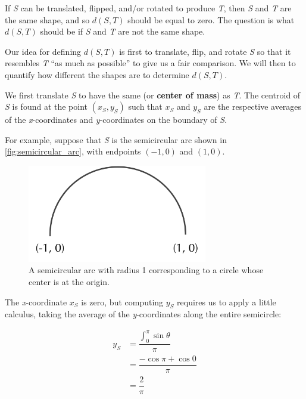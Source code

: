 If \textit{S} can be translated, flipped, and/or rotated to produce \textit{T}, then \textit{S} and \textit{T} are the same shape, and so $d(S, T)$ should be equal to zero. The question is what $d(S, T)$ should be if \textit{S} and \textit{T} are not the same shape.

Our idea for defining $d(S, T)$ is first to translate, flip, and rotate \textit{S} so that it resembles \textit{T} ``as much as possible'' to give us a fair comparison. We will then to quantify how different the shapes are to determine $d(S, T)$.

We first translate \textit{S} to have the same  (or \textbf{center of mass}) as \textit{T}. The centroid of \textit{S} is found at the point $(x_{S}, y_{S})$ such that $x_{S}$ and $y_{S}$ are the respective averages of the \textit{x}-coordinates and \textit{y}-coordinates on the boundary of \textit{S}.

For example, suppose that \textit{S} is the semicircular arc shown in \autoref{fig:semicircular_arc}, with endpoints $(-1, 0)$ and $(1, 0)$.

\begin{figure}[h]
	\centering
	\mySfFamily
	\includegraphics[width = 0.7\textwidth]{../images/semicircular_arc.png}
	\caption{A semicircular arc with radius 1 corresponding to a circle whose center is at the origin.}
	\label{fig:semicircular_arc}
\end{figure}

The \textit{x}-coordinate $x_{S}$ is zero, but computing $y_{S}$ requires us to apply a little calculus, taking the average of the \textit{y}-coordinates along the entire semicircle:

\begin{align*}
	y_S &= \dfrac{\int_{0}^{\pi}{\sin{\theta}}}{\pi} \\
	&= \dfrac{-\cos{\pi} + \cos{0}}{\pi} \\
	&= \dfrac{2}{\pi}
\end{align*}




